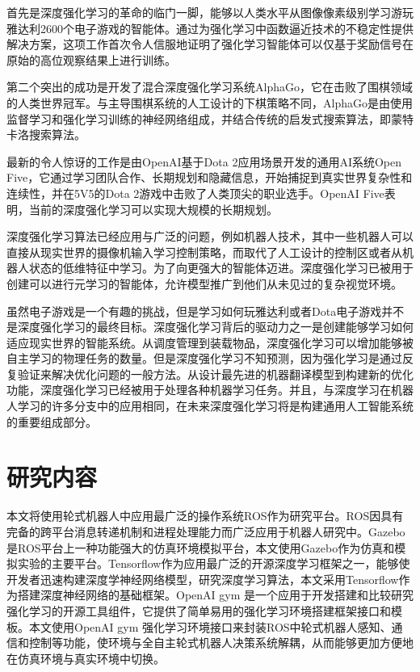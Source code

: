 首先是深度强化学习的革命的临门一脚，能够以人类水平从图像像素级别学习游玩雅达利2600个电子游戏的智能体\cite{11}。通过为强化学习中函数逼近技术的不稳定性提供解决方案，这项工作首次令人信服地证明了强化学习智能体可以仅基于奖励信号在原始的高位观察结果上进行训练。

第二个突出的成功是开发了混合深度强化学习系统AlphaGo\cite{12}，它在击败了围棋领域的人类世界冠军。与主导围棋系统的人工设计的下棋策略不同，AlphaGo是由使用监督学习和强化学习训练的神经网络组成，并结合传统的启发式搜索算法，即蒙特卡洛搜索算法。

最新的令人惊讶的工作是由OpenAI基于Dota 2应用场景开发的通用AI系统Open Five，它通过学习团队合作、长期规划和隐藏信息，开始捕捉到真实世界复杂性和连续性，并在5V5的Dota 2游戏中击败了人类顶尖的职业选手。OpenAI Five表明，当前的深度强化学习可以实现大规模的长期规划。

深度强化学习算法已经应用与广泛的问题，例如机器人技术，其中一些机器人可以直接从现实世界的摄像机输入学习控制策略\cite{13}\cite{14}，而取代了人工设计的控制区或者从机器人状态的低维特征中学习。为了向更强大的智能体迈进。深度强化学习已被用于创建可以进行元学习的智能体\cite{15}\cite{16}，允许模型推广到他们从未见过的复杂视觉环境。

虽然电子游戏是一个有趣的挑战，但是学习如何玩雅达利或者Dota电子游戏并不是深度强化学习的最终目标。深度强化学习背后的驱动力之一是创建能够学习如何适应现实世界的智能系统。从调度管理到装载物品，深度强化学习可以增加能够被自主学习的物理任务的数量。但是深度强化学习不知预测，因为强化学习是通过反复验证来解决优化问题的一般方法。从设计最先进的机器翻译模型到构建新的优化功能，深度强化学习已经被用于处理各种机器学习任务。并且，与深度学习在机器人学习的许多分支中的应用相同，在未来深度强化学习将是构建通用人工智能系统的重要组成部分。

\section{研究内容}
本文将使用轮式机器人中应用最广泛的操作系统ROS作为研究平台。ROS因具有完备的跨平台消息转递机制和进程处理能力而广泛应用于机器人研究中。Gazebo是ROS平台上一种功能强大的仿真环境模拟平台，本文使用Gazebo作为仿真和模拟实验的主要平台。Tensorflow作为应用最广泛的开源深度学习框架之一，能够使开发者迅速构建深度学神经网络模型，研究深度学习算法，本文采用Tensorflow作为搭建深度神经网络的基础框架。OpenAI gym 是一个应用于开发搭建和比较研究强化学习的开源工具组件，它提供了简单易用的强化学习环境搭建框架接口和模板。本文使用OpenAI gym 强化学习环境接口来封装ROS中轮式机器人感知、通信和控制等功能，使环境与全自主轮式机器人决策系统解耦，从而能够更加方便地在仿真环境与真实环境中切换。

